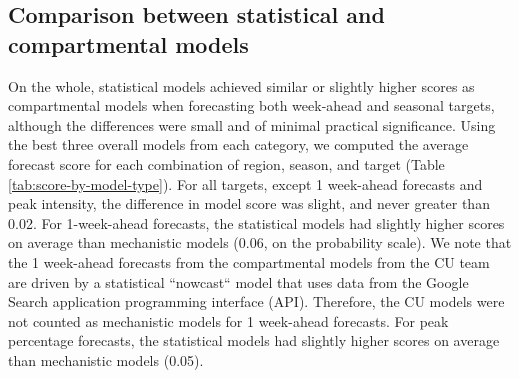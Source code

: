 \documentclass[9pt,twocolumn,twoside]{pnas-new}\usepackage[]{graphicx}\usepackage[]{color}
\begin{document}
\subsection*{Comparison between statistical and compartmental models} \label{sec:stat-mech}




On the whole, statistical models achieved similar or slightly higher scores as compartmental models when forecasting both week-ahead and seasonal targets, although the differences were small and of minimal practical significance. 
Using the best three overall models from each category, we computed the average forecast score for each combination of region, season, and target (Table \ref{tab:score-by-model-type}). 
For all targets, except 1 week-ahead forecasts and peak intensity, the difference in model score was slight, and never greater than 
0.02.
For 1-week-ahead forecasts, the statistical models had slightly higher scores on average than mechanistic models  
(0.06, on the probability scale). 
We note that the 1 week-ahead forecasts from the compartmental models from the CU team are driven by a statistical ``nowcast`` model that uses data from the Google Search application programming interface (API).\cite{Kandula2017}
Therefore, the CU models were not counted as mechanistic models for 1 week-ahead forecasts.
For peak percentage forecasts, the statistical models had slightly higher scores on average than mechanistic models  
(0.05). 




% 
\end{document}
